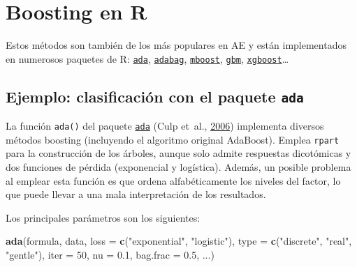 \documentclass[
  spanish,
]{book}
\newenvironment{Shaded}{\begin{snugshade}}{\end{snugshade}}
\newcommand{\DataTypeTok}[1]{\textcolor[rgb]{0.13,0.29,0.53}{#1}}
\newcommand{\DecValTok}[1]{\textcolor[rgb]{0.00,0.00,0.81}{#1}}
\newcommand{\FloatTok}[1]{\textcolor[rgb]{0.00,0.00,0.81}{#1}}
\newcommand{\KeywordTok}[1]{\textcolor[rgb]{0.13,0.29,0.53}{\textbf{#1}}}
\newcommand{\NormalTok}[1]{#1}
\newcommand{\StringTok}[1]{\textcolor[rgb]{0.31,0.60,0.02}{#1}}
\theoremstyle{break}
\theoremstyle{definition}
\theoremstyle{definition}
\theoremstyle{definition}
\theoremstyle{remark}
\begin{document}
\hypertarget{boosting-en-r}{%
\section{Boosting en R}\label{boosting-en-r}}

Estos métodos son también de los más populares en AE y están implementados en numerosos paquetes de R: \href{https://CRAN.R-project.org/package=ada}{\texttt{ada}}, \href{https://CRAN.R-project.org/package=adabag}{\texttt{adabag}}, \href{https://CRAN.R-project.org/package=mboost}{\texttt{mboost}}, \href{https://CRAN.R-project.org/package=gbm}{\texttt{gbm}}, \href{https://github.com/dmlc/xgboost/tree/master/R-package}{\texttt{xgboost}}\ldots{}

\hypertarget{ejemplo-clasificaciuxf3n-con-el-paquete-ada}{%
\subsection{\texorpdfstring{Ejemplo: clasificación con el paquete \texttt{ada}}{Ejemplo: clasificación con el paquete ada}}\label{ejemplo-clasificaciuxf3n-con-el-paquete-ada}}

La función \texttt{ada()} del paquete \href{https://CRAN.R-project.org/package=ada}{\texttt{ada}} (Culp et~al., \protect\hyperlink{ref-culp2006ada}{2006}) implementa diversos métodos boosting (incluyendo el algoritmo original AdaBoost).
Emplea \texttt{rpart} para la construcción de los árboles, aunque solo admite respuestas dicotómicas y dos funciones de pérdida (exponencial y logística).
Además, un posible problema al emplear esta función es que ordena alfabéticamente los niveles del factor, lo que puede llevar a una mala interpretación de los resultados.

Los principales parámetros son los siguientes:

\begin{Shaded}
\begin{Highlighting}[]
\KeywordTok{ada}\NormalTok{(formula, data, }\DataTypeTok{loss =} \KeywordTok{c}\NormalTok{(}\StringTok{"exponential"}\NormalTok{, }\StringTok{"logistic"}\NormalTok{),}
    \DataTypeTok{type =} \KeywordTok{c}\NormalTok{(}\StringTok{"discrete"}\NormalTok{, }\StringTok{"real"}\NormalTok{, }\StringTok{"gentle"}\NormalTok{), }\DataTypeTok{iter =} \DecValTok{50}\NormalTok{, }
    \DataTypeTok{nu =} \FloatTok{0.1}\NormalTok{, }\DataTypeTok{bag.frac =} \FloatTok{0.5}\NormalTok{, ...)}
\end{Highlighting}
\end{Shaded}
\end{document}
